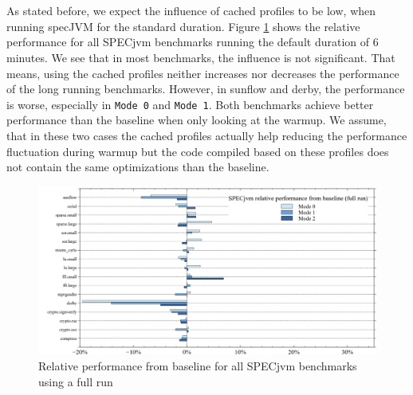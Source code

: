 \\\\
As stated before, we expect the influence of cached profiles to be low, when running specJVM for the standard duration. Figure \ref{f:all_full_variation} shows the relative performance for all SPECjvm benchmarks running the default duration of 6 minutes.
We see that in most benchmarks, the influence is not significant. That means, using the cached profiles neither increases nor decreases the performance of the long running benchmarks.
However, in sunflow and derby, the performance is worse, especially in \texttt{Mode 0} and \texttt{Mode 1}. Both benchmarks achieve better performance than the baseline when only looking at the warmup. We assume, that in these two cases the cached profiles actually help reducing the performance fluctuation during warmup but the code compiled based on these profiles does not contain the same optimizations than the baseline.
\begin{figure}[ht]
  \begin{center}
    \centering
    \includegraphics[width=1.0\textwidth]{figures/all_full_variation.png}
    \caption{Relative performance from baseline for all SPECjvm benchmarks using a full run}
    \label{f:all_full_variation}
  \end{center}
\end{figure} 
